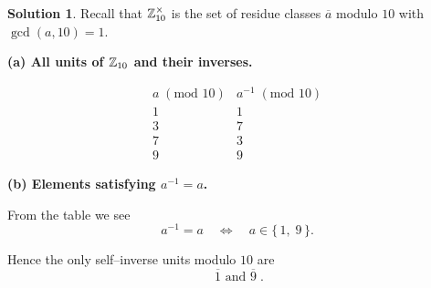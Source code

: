 \documentclass[12pt]{article}
\theoremstyle{definition} %
\newtheorem{solution}{Solution}
\theoremstyle{plain} %
\begin{document}
        \begin{solution}
          Recall that \(\Bbb Z_{10}^{\times}\) is the set of residue classes
          \(\overline{a}\) modulo \(10\) with \(\gcd(a,10)=1\).
          
          \bigskip
          \textbf{(a)  All units of \(\Bbb Z_{10}\) and their inverses.}
          
          \[
          \renewcommand{\arraystretch}{1.3}
          \begin{array}{c|c}
          a\;(\text{mod }10) & a^{-1}\;(\text{mod }10) \\\hline
          1 & 1 \\ 
          3 & 7 \\ 
          7 & 3 \\ 
          9 & 9
          \end{array}
          \]
          
          \bigskip
          \textbf{(b)  Elements satisfying \(a^{-1}=a\).}
          
          From the table we see
          \[
             a^{-1}=a \quad\Longleftrightarrow\quad a\in\{\,1,\;9\,\}.
          \]
          
          Hence the only self–inverse units modulo \(10\) are
          \[
          \boxed{\;\overline{1}\text{ and }\overline{9}\;}.
          \]
          \end{solution}
\end{document}
